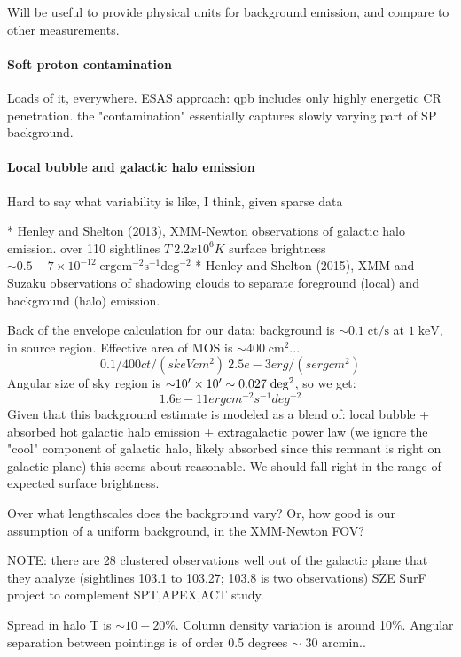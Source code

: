 \documentclass[preprint2,tighten,trackchanges]{aastex6}
\newcommand*{\mt}{\mathrm}
\newcommand*{\unit}[1]{\;\mt{#1}}  %
\newcommand*{\abt}{\mathord{\sim}} %
\begin{document}
Will be useful to provide physical units for background emission, and compare
to other measurements.

\paragraph{Soft proton contamination}

Loads of it, everywhere.
ESAS approach: qpb includes only highly energetic CR penetration.
the "contamination" essentially captures slowly varying part of SP background.

\paragraph{Local bubble and galactic halo emission}

Hard to say what variability is like, I think, given sparse data

* Henley and Shelton (2013), XMM-Newton observations of galactic halo emission.
  over 110 sightlines
    $T ~ 2.2 x 10^6 K$
    surface brightness $\abt 0.5-7 \times 10^{-12} \unit{erg cm^{-2} s^{-1} deg^{-2}}$
* Henley and Shelton (2015), XMM and Suzaku observations of shadowing clouds
  to separate foreground (local) and background (halo) emission.

Back of the envelope calculation for our data:
background is $\abt0.1 \unit{ct/s}$ at $1 \unit{keV}$, in source region.
Effective area of MOS is $\abt400 \unit{cm^2}$...
\[
    0.1/400 ct/(s keV cm^2) ~ 2.5e-3 erg / (s erg cm^2)
\]
Angular size of sky region is $\abt 10\arcmin \times 10\arcmin \sim 0.027 \unit{deg^2}$, so we get:
\[
    1.6e-11 erg cm^{-2} s^{-1} deg^{-2}
\]
Given that this background estimate is modeled as a blend of:
local bubble + absorbed hot galactic halo emission + extragalactic power law
(we ignore the "cool" component of galactic halo, likely absorbed since
this remnant is right on galactic plane)
this seems about reasonable.  We should fall right in the range of expected
surface brightness.


Over what lengthscales does the background vary?  Or, how good is our
assumption of a uniform background, in the XMM-Newton FOV?

NOTE: there are 28 clustered observations well out of the galactic plane
that they analyze (sightlines 103.1 to 103.27; 103.8 is two observations)
SZE SurF project to complement SPT,APEX,ACT study.

    Spread in halo T is $\abt10-20\%$.  Column density variation is around 10\%.
    Angular separation between pointings is of order 0.5 degrees $\sim$ 30 arcmin..
\end{document}
